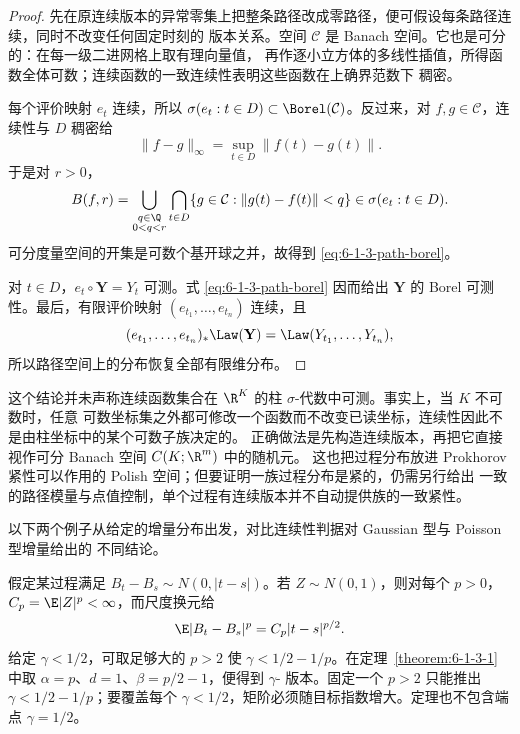 \begin{proof}
先在原连续版本的异常零集上把整条路径改成零路径，便可假设每条路径连续，同时不改变任何固定时刻的
版本关系。空间 $\mathcal C$ 是 Banach 空间。它也是可分的：在每一级二进网格上取有理向量值，
再作逐小立方体的多线性插值，所得函数全体可数；连续函数的一致连续性表明这些函数在上确界范数下
稠密。

每个评价映射 $e_t$ 连续，所以
$\sigma(e_t:t\in D)\subset\Borel(\mathcal C)$。反过来，对 $f,g\in\mathcal C$，连续性与 $D$ 稠密给
\[
  \|f-g\|_\infty=\sup_{t\in D}\|f(t)-g(t)\|.
\]
于是对 $r>0$，
\[
 B(f,r)
 =\bigcup_{\substack{q\in\Q\\0<q<r}}
   \bigcap_{t\in D}\{g\in\mathcal C:\|g(t)-f(t)\|<q\}
 \in\sigma(e_t:t\in D).
\]
可分度量空间的开集是可数个基开球之并，故得到
\eqref{eq:6-1-3-path-borel}。

对 $t\in D$，$e_t\circ\mathbf Y=Y_t$ 可测。式
\eqref{eq:6-1-3-path-borel} 因而给出 $\mathbf Y$ 的 Borel 可测性。最后，有限评价映射
$(e_{t_1},\ldots,e_{t_n})$ 连续，且
\[
 (e_{t_1},\ldots,e_{t_n})_*\Law(\mathbf Y)
 =\Law(Y_{t_1},\ldots,Y_{t_n}),
\]
所以路径空间上的分布恢复全部有限维分布。
\end{proof}

这个结论并未声称连续函数集合在 $\R^K$ 的柱 $\sigma$-代数中可测。事实上，当 $K$ 不可数时，任意
可数坐标集之外都可修改一个函数而不改变已读坐标，连续性因此不是由柱坐标中的某个可数子族决定的。
正确做法是先构造连续版本，再把它直接视作可分 Banach 空间 $C(K;\R^m)$ 中的随机元。
这也把过程分布放进 Prokhorov 紧性可以作用的 Polish 空间；但要证明一族过程分布是紧的，仍需另行给出
一致的路径模量与点值控制，单个过程有连续版本并不自动提供族的一致紧性。

\begin{remark}[两类增量模型的路径正则性]
以下两个例子从给定的增量分布出发，对比连续性判据对 Gaussian 型与 Poisson 型增量给出的
不同结论。
\end{remark}

\begin{example}\label{ex:6-1-3-2}
假定某过程满足 $B_t-B_s\sim N(0,|t-s|)$。若 $Z\sim N(0,1)$，则对每个 $p>0$，
$C_p=\E|Z|^p<\infty$，而尺度换元给
\[
  \E|B_t-B_s|^p=C_p|t-s|^{p/2}.
\]
给定 $\gamma<1/2$，可取足够大的 $p>2$ 使
$\gamma<1/2-1/p$。在定理~\ref{theorem:6-1-3-1} 中取
$\alpha=p$、$d=1$、$\beta=p/2-1$，便得到 $\gamma$-\Holder{} 版本。固定一个 $p>2$ 只能推出
$\gamma<1/2-1/p$；要覆盖每个 $\gamma<1/2$，矩阶必须随目标指数增大。定理也不包含端点
$\gamma=1/2$。
\end{example}

